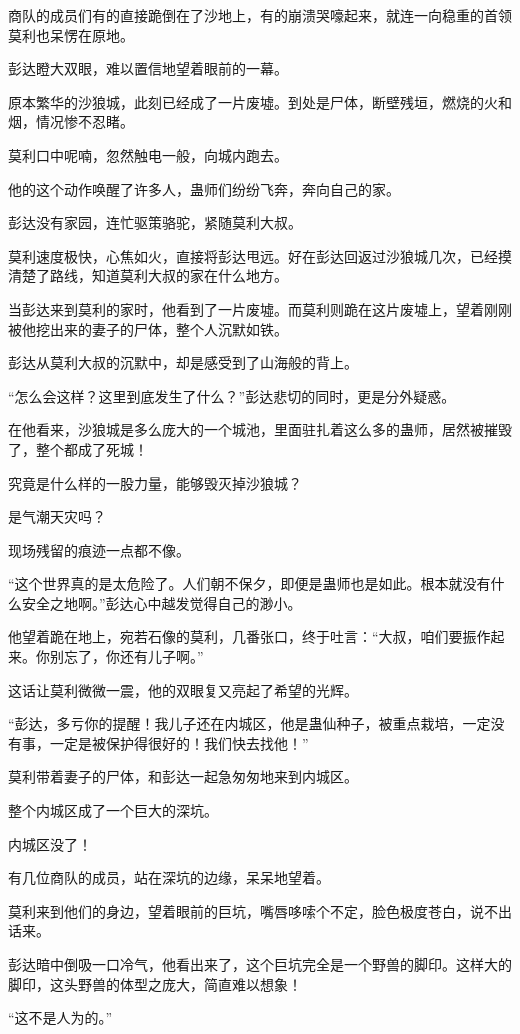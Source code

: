 \begin{this_body}
商队的成员们有的直接跪倒在了沙地上，有的崩溃哭嚎起来，就连一向稳重的首领莫利也呆愣在原地。

彭达瞪大双眼，难以置信地望着眼前的一幕。

原本繁华的沙狼城，此刻已经成了一片废墟。到处是尸体，断壁残垣，燃烧的火和烟，情况惨不忍睹。

莫利口中呢喃，忽然触电一般，向城内跑去。

他的这个动作唤醒了许多人，蛊师们纷纷飞奔，奔向自己的家。

彭达没有家园，连忙驱策骆驼，紧随莫利大叔。

莫利速度极快，心焦如火，直接将彭达甩远。好在彭达回返过沙狼城几次，已经摸清楚了路线，知道莫利大叔的家在什么地方。

当彭达来到莫利的家时，他看到了一片废墟。而莫利则跪在这片废墟上，望着刚刚被他挖出来的妻子的尸体，整个人沉默如铁。

彭达从莫利大叔的沉默中，却是感受到了山海般的背上。

“怎么会这样？这里到底发生了什么？”彭达悲切的同时，更是分外疑惑。

在他看来，沙狼城是多么庞大的一个城池，里面驻扎着这么多的蛊师，居然被摧毁了，整个都成了死城！

究竟是什么样的一股力量，能够毁灭掉沙狼城？

是气潮天灾吗？

现场残留的痕迹一点都不像。

“这个世界真的是太危险了。人们朝不保夕，即便是蛊师也是如此。根本就没有什么安全之地啊。”彭达心中越发觉得自己的渺小。

他望着跪在地上，宛若石像的莫利，几番张口，终于吐言：“大叔，咱们要振作起来。你别忘了，你还有儿子啊。”

这话让莫利微微一震，他的双眼复又亮起了希望的光辉。

“彭达，多亏你的提醒！我儿子还在内城区，他是蛊仙种子，被重点栽培，一定没有事，一定是被保护得很好的！我们快去找他！”

莫利带着妻子的尸体，和彭达一起急匆匆地来到内城区。

整个内城区成了一个巨大的深坑。

内城区没了！

有几位商队的成员，站在深坑的边缘，呆呆地望着。

莫利来到他们的身边，望着眼前的巨坑，嘴唇哆嗦个不定，脸色极度苍白，说不出话来。

彭达暗中倒吸一口冷气，他看出来了，这个巨坑完全是一个野兽的脚印。这样大的脚印，这头野兽的体型之庞大，简直难以想象！

“这不是人为的。”


\end{this_body}
